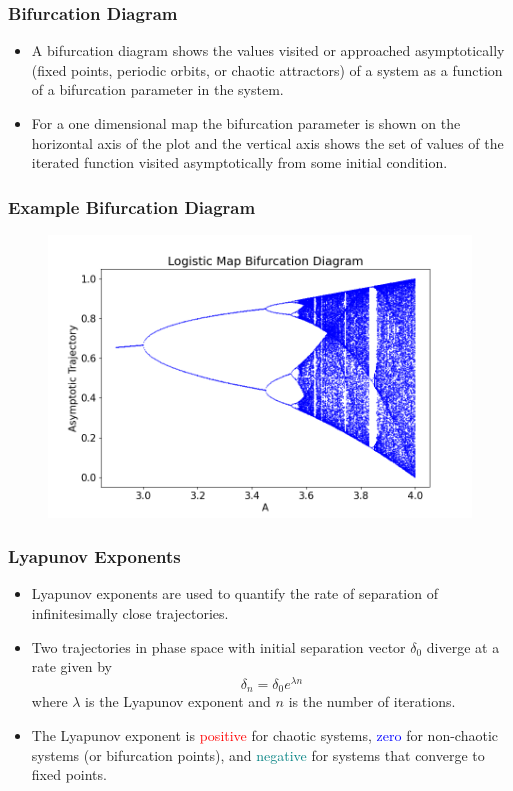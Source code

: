 \documentclass[
	11pt, %
	aspectratio=169, %
]{beamer}
\begin{document}

\begin{frame}
	\frametitle{Bifurcation Diagram}
    \begin{itemize}
        \item A bifurcation diagram shows the values visited or approached asymptotically (fixed points, periodic orbits, or chaotic attractors) of a system as a function of a bifurcation parameter in the system. \pause
        \item For a one dimensional map the bifurcation parameter is shown on the horizontal axis of the plot and the vertical axis shows the set of values of the iterated function visited asymptotically from some initial condition.
    \end{itemize}
\end{frame}


\begin{frame}
	\frametitle{Example Bifurcation Diagram}
    \begin{figure}
        \includegraphics[width=0.6\linewidth]{logistic_bifurcation_diagram.png}
    \end{figure}
\end{frame}


\begin{frame}
	\frametitle{Lyapunov Exponents}
    \begin{itemize}
        \item Lyapunov exponents are used to quantify the rate of separation of infinitesimally close trajectories. \pause
        \item Two trajectories in phase space with initial separation vector $\delta_0$ diverge at a rate given by 
        \begin{equation}
            \delta_n = \delta_0 e^{\lambda n}
        \end{equation}
        where $\lambda$ is the Lyapunov exponent and $n$ is the number of iterations. \pause
        \item The Lyapunov exponent is \textcolor{red}{positive} for chaotic systems, \textcolor{blue}{zero} for non-chaotic systems (or bifurcation points), and \textcolor{teal}{negative} for systems that converge to fixed points.
    \end{itemize}
\end{frame}
\end{document}
